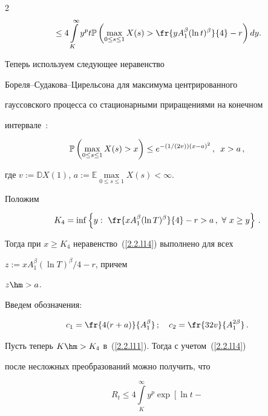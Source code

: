 \begin{multicols}{2}
\begin{multline}
\!\!{}\leq 4 \int\limits_{K}^\infty y^p  t


\Pu\left(\max\limits_{0\leq s \leq 1}X(s)>


\fr{y A_1^\beta(\ln t)^\beta}{4}-r\right)dy.\!\! \label{2.2.l11}


\end{multline}


Теперь   используем  следующее неравенство


Бо\-ре\-ля--Су\-да\-ко\-ва--Ци\-рель\-со\-на для максимума центрированного


гауссовского процесса со стационарными приращениями на конечном


интервале~\cite{Adler, Lifshits}:


\begin{equation}


\Pu \left( \max\limits_{0 \leq s \leq 1} X(s)> x \right) \leq


e^{-({1}/{(2v)})(x-a)^2}\,, \enskip x>a\,,


\label{2.2.l14}


\end{equation}


где $v:=\mathbb{D} X(1)$, $a:=\mathbb{E} \max\limits_{0 \leq s \leq 1} X(s)<\infty$.


Положим


$$


K_4=\inf\left\{y:\,\,\fr{x A_1^\beta(\ln T)^\beta}{4}-r>a\,,\ \forall\  x \geq y\right\}\,.


$$


Тогда при  $x\ge K_4$ неравенство~(\ref{2.2.l14}) выполнено для всех


$z:={x A_1^\beta(\ln T)^\beta}/{4}-r$,   причем


$ z\hm>a$.





  Введем обозначения:


$$


c_1=\fr{4(r+a)}{A_1^\beta}\,;\quad c_2=\fr{32 v }{A_1^{2\beta}}\,.


$$


Пусть теперь  $K\hm>K_4$ в~(\ref{2.2.l11}).  Тогда с учетом~(\ref{2.2.l14}) 


после несложных преобразований можно получить, что


\begin{equation}


R_t \leq 4 \int\limits_{K}^\infty y^p \exp\left[ \ln t -



\end{equation}
\end{multicols}

